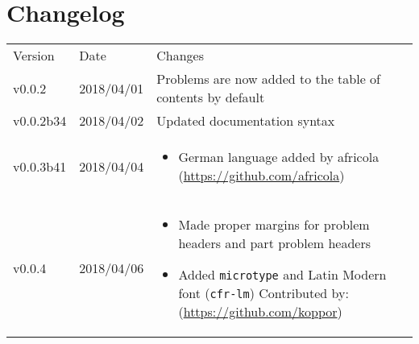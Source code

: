 \documentclass{article}
\let\oldhref\href
\gdef\href#1#2{{\color{magenta}\oldhref{#1}{#2}}}
\let\oldsection\section
\gdef\section{\needspace{0.3\paperheight}\oldsection}
\begin{document}
\section{Changelog}
\begin{tabularx}{\textwidth}{llX}
  Version&Date&Changes\\
  v0.0.2&2018/04/01&Problems are now added to the table of contents by default\\
  v0.0.2b34&2018/04/02&Updated documentation syntax\\
  v0.0.3b41&2018/04/04&\begin{itemize}
    \item German language added by africola \newline (\url{https://github.com/africola})
  \end{itemize}\\
  v0.0.4&2018/04/06&\begin{itemize}
    \item Made proper margins for problem headers and part problem headers
    \item Added \texttt{microtype} and Latin Modern font (\texttt{cfr-lm})\newline
    Contributed by:\newline
    \href{https://github.com/koppor}{koppor} (\url{https://github.com/koppor})
  \end{itemize}\\
\end{tabularx}
 
\end{document}
